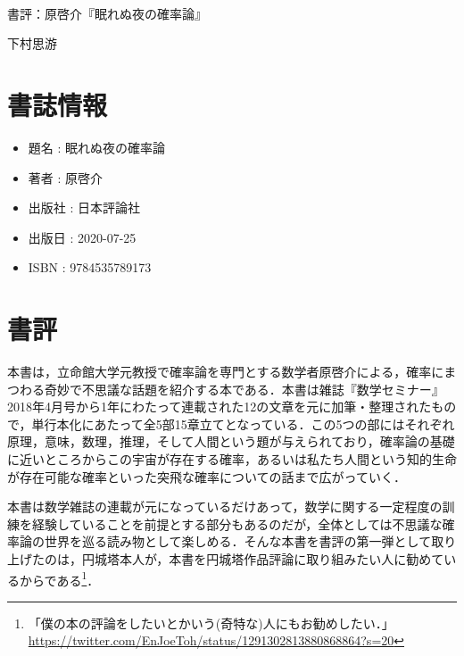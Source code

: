 \documentclass[10pt, a5paper, twoside]{jsarticle}
\theoremstyle{definition}
\begin{document}
	{\Large 　} %

	\begin{center}

		\Large{書評：原啓介『眠れぬ夜の確率論』}

		\vspace{3mm}
		
		\large{下村思游}

	\end{center}

	\section{書誌情報}

		\begin{itemize}
			
			\item 題名 : 眠れぬ夜の確率論

			\item 著者 : 原啓介

			\item 出版社 : 日本評論社

			\item 出版日 : 2020-07-25

			\item ISBN : 9784535789173
		
		\end{itemize}

	\section{書評}

		本書は，立命館大学元教授で確率論を専門とする数学者原啓介による，確率にまつわる奇妙で不思議な話題を紹介する本である．本書は雑誌『数学セミナー』2018年4月号から1年にわたって連載された12の文章を元に加筆・整理されたもので，単行本化にあたって全5部15章立てとなっている．この5つの部にはそれぞれ原理，意味，数理，推理，そして人間という題が与えられており，確率論の基礎に近いところからこの宇宙が存在する確率，あるいは私たち人間という知的生命が存在可能な確率といった突飛な確率についての話まで広がっていく．

		本書は数学雑誌の連載が元になっているだけあって，数学に関する一定程度の訓練を経験していることを前提とする部分もあるのだが，全体としては不思議な確率論の世界を巡る読み物として楽しめる．そんな本書を書評の第一弾として取り上げたのは，円城塔本人が，本書を円城塔作品評論に取り組みたい人に勧めているからである\footnote{「僕の本の評論をしたいとかいう(奇特な)人にもお勧めしたい．」 \\ \url{https://twitter.com/EnJoeToh/status/1291302813880868864?s=20}}．
\end{document}
